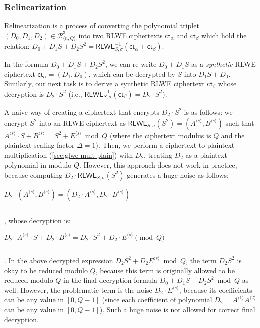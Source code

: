 \subsubsection{Relinearization}
\label{subsubsec:bfv-mult-cipher-relinearization}

Relinearization is a process of converting the polynomial triplet $(D_0, D_1, D_2) \in \mathcal{R}_{\langle n, Q \rangle}^{3}$ into two RLWE ciphertexts $\textsf{ct}_\alpha$ and $\textsf{ct}_\beta$ which hold the relation: $D_0 + D_1 S + D_2 S^2 = \textsf{RLWE}^{-1}_{S, \sigma}(\textsf{ct}_\alpha + \textsf{ct}_\beta)$. 

In the formula $D_0 + D_1 S + D_2 S^2$, we can re-write $D_0 + D_1 S$ as a \textit{synthetic} RLWE ciphertext $\textsf{ct}_\alpha = (D_1, D_0)$, which can be decrypted by $S$ into $D_1 S + D_0$. Similarly, our next task is to derive a synthetic RLWE ciphertext $\textsf{ct}_\beta$ whose decryption is $D_2 \cdot S^2$ (i.e., $\textsf{RLWE}_{S, \sigma}^{-1}(\textsf{ct}_\beta) = D_2\cdot S^2$). 

A naive way of creating a ciphertext that encrypts $D_2 \cdot S^2$ is as follows: we encrypt $S^2$ into an RLWE ciphertext as $\textsf{RLWE}_{S, \sigma}(S^2) = (A^{\langle s \rangle}, B^{\langle s \rangle})$ such that $A^{\langle s \rangle}\cdot S + B^{\langle s \rangle} = S^2 + E^{\langle s \rangle} \bmod Q$ (where the ciphertext modulus is $Q$ and the plaintext scaling factor $\Delta = 1$). Then, we perform a ciphertext-to-plaintext multiplication (\autoref{sec:glwe-mult-plain}) with $D_2$, treating $D_2$ as a plaintext polynomial in modulo $Q$. However, this approach does not work in practice, because computing $D_2 \cdot \textsf{RLWE}_{S, \sigma}(S^2)$ generates a huge noise as follows:

$D_2 \cdot (A^{\langle s \rangle}, B^{\langle s \rangle}) = (D_2\cdot A^{\langle s \rangle}, D_2 \cdot B^{\langle s \rangle})$

$ $

, whose decryption is:

$D_2\cdot A^{\langle s \rangle} \cdot S + D_2\cdot B^{\langle s \rangle} = D_2 \cdot S^2 + D_2\cdot E^{\langle s \rangle} \pmod Q$ 

$ $

. In the above decrypted expression $D_2S^2 + D_2E^{\langle s \rangle} \bmod Q$, the term $D_2S^2$ is okay to be reduced modulo $Q$, because this term is originally allowed to be reduced modulo $Q$ in the final decryption formula $D_0 + D_1S + D_2S^2 \bmod Q$ as well. However, the problematic term is the noise $D_2\cdot E^{\langle s \rangle}$, because its coefficients can be any value in $[0, Q - 1]$ (since each coefficient of polynomial $D_2 = A^{\langle 1 \rangle} A^{\langle 2 \rangle}$ can be any value in $[0, Q - 1]$). Such a huge noise is not allowed for correct final decryption. 

